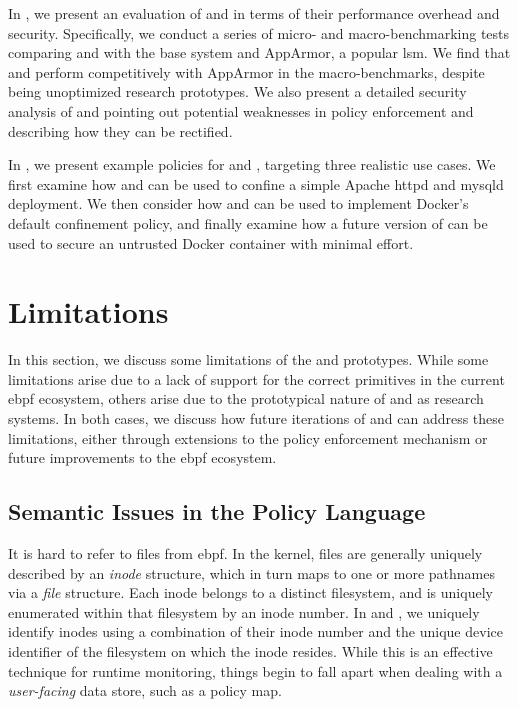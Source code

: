 In , we present an evaluation of \bpfbox{} and \bpfcontain{} in terms
of their performance overhead and security. Specifically, we conduct a series of micro-
and macro-benchmarking tests comparing \bpfbox{} and \bpfcontain{} with the base system
and AppArmor, a popular \gls{lsm}. We find that \bpfbox{} and \bpfcontain{} perform
competitively with AppArmor in the macro-benchmarks, despite being unoptimized research
prototypes. We also present a detailed security analysis of \bpfbox{} and \bpfcontain{}
pointing out potential weaknesses in policy enforcement and describing how they can be
rectified.

In , we present example policies for \bpfbox{} and \bpfcontain{},
targeting three realistic use cases. We first examine how \bpfbox{} and \bpfcontain{} can
be used to confine a simple Apache httpd and mysqld deployment. We then consider how
\bpfbox{} and \bpfcontain{} can be used to implement Docker's default confinement policy,
and finally examine how a future version of \bpfcontain{} can be used to secure an
untrusted Docker container with minimal effort.

\section{Limitations}%
\label{s:disc-limitations}

In this section, we discuss some limitations of the \bpfbox{} and \bpfcontain{}
prototypes. While some limitations arise due to a lack of support for the correct
primitives in the current \gls{ebpf} ecosystem, others arise due to the prototypical
nature of \bpfbox{} and \bpfcontain{} as research systems. In both cases, we discuss how
future iterations of \bpfbox{} and \bpfcontain{} can address these limitations, either
through extensions to the policy enforcement mechanism or future improvements to the
\gls{ebpf} ecosystem.

\subsection{Semantic Issues in the Policy Language}%
\label{ss:disc-semantic-issues}

It is hard to refer to files from \gls{ebpf}. In the kernel, files are generally uniquely
described by an \textit{inode} structure, which in turn maps to one or more pathnames via
a \textit{file} structure. Each inode belongs to a distinct filesystem, and is uniquely
enumerated within that filesystem by an inode number.  In \bpfbox{} and \bpfcontain{}, we
uniquely identify inodes using a combination of their inode number and the unique device
identifier of the filesystem on which the inode resides. While this is an effective
technique for runtime monitoring, things begin to fall apart when dealing with
a \textit{user-facing} data store, such as a policy map.

